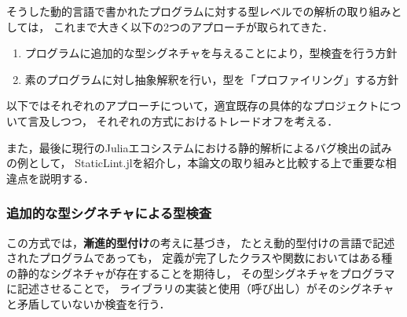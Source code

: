 そうした動的言語で書かれたプログラムに対する型レベルでの解析の取り組みとしては，
これまで大きく以下の2つのアプローチが取られてきた．

\begin{enumerate}
  \item プログラムに追加的な型シグネチャを与えることにより，型検査を行う方針
  \item 素のプログラムに対し抽象解釈を行い，型を「プロファイリング」する方針
\end{enumerate}

以下ではそれぞれのアプローチについて，適宜既存の具体的なプロジェクトについて言及しつつ，
それぞれの方式におけるトレードオフを考える．

また，最後に現行のJuliaエコシステムにおける静的解析によるバグ検出の試みの例として，
StaticLint.jlを紹介し，本論文の取り組みと比較する上で重要な相違点を説明する．

\subsubsection{追加的な型シグネチャによる型検査} \label{subsubsection:type-check-with-annotation}

この方式では，\textbf{漸進的型付け}\cite{gradual-typing}の考えに基づき，
たとえ動的型付けの言語で記述されたプログラムであっても，
定義が完了したクラスや関数においてはある種の静的なシグネチャが存在することを期待し，
その型シグネチャをプログラマに記述させることで，
ライブラリの実装と使用（呼び出し）がそのシグネチャと矛盾していないか検査を行う\cite{ruby-progress-report}．

